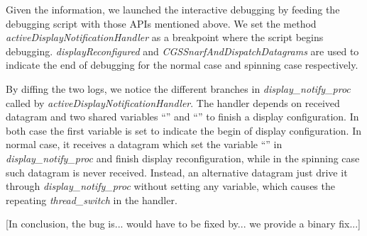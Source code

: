 Given the information, we launched the interactive debugging by 
feeding the debugging script with those APIs mentioned above. We set the method
\textit{activeDisplayNotificationHandler} as a breakpoint where the script begins
debugging. \textit{displayReconfigured} and \textit{CGSSnarfAndDispatchDatagrams}
are used to indicate the end of debugging for the normal case and spinning case
respectively.

By diffing the two logs, we notice the different
branches in \textit{display\_notify\_proc} called by
\textit{activeDisplayNotificationHandler}. The handler depends on received
datagram and two shared variables ``'' and
``'' to finish a display configuration. In
both case the first variable is set to indicate the begin of display
configuration. In normal case, it receives a datagram which set the variable
``'' in \textit{display\_notify\_proc} and
finish display reconfiguration, while in the spinning case such datagram
is never received. Instead, an alternative datagram just drive it through
\textit{display\_notify\_proc} without setting any variable, which causes the
repeating \textit{thread\_switch} in the handler.

[In conclusion, the bug is... would have to be fixed by... we provide a binary fix...]
